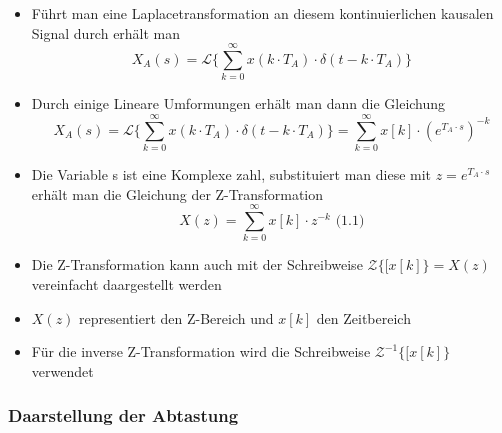 \documentclass[11pt]{article}
\providecommand{\tightlist}{%
      \setlength{\itemsep}{0pt}\setlength{\parskip}{0pt}}
\begin{document}
    \begin{itemize}
\tightlist
\item
  Führt man eine Laplacetransformation an diesem kontinuierlichen
  kausalen Signal durch erhält man
  \[X_A(s) = \mathcal{L}\{\sum_{k=0}^\infty x( k \cdot T_A ) \cdot \delta ( t - k \cdot T_A )\}\label{eq:xAs}\]
\end{itemize}

    \begin{itemize}
\tightlist
\item
  Durch einige Lineare Umformungen erhält man dann die Gleichung
  \[X_A(s) = \mathcal{L}\{\sum_{k=0}^\infty x( k \cdot T_A ) \cdot \delta ( t - k \cdot T_A )\} = \sum_{k=0}^\infty x[k] \cdot (e^{T_A \cdot s})^{-k}\label{eq:LxAk}\]
\end{itemize}

    \begin{itemize}
\tightlist
\item
  Die Variable s ist eine Komplexe zahl, substituiert man diese mit
  \(z = e^{T_A \cdot s}\label{eq:Zsubs}\) erhält man die Gleichung der
  Z-Transformation
  \[X(z) = \sum_{k=0}^\infty x[k] \cdot z^{-k}\textrm{  (1.1)}\]
\end{itemize}

    \begin{itemize}
\item
  Die Z-Transformation kann auch mit der Schreibweise
  \(\mathcal{Z}\{[x[k]\} = X(z)\) vereinfacht daargestellt werden
\item
  \(X(z)\) representiert den Z-Bereich und \(x[k]\) den Zeitbereich
\item
  Für die inverse Z-Transformation wird die Schreibweise
  \({\mathcal{Z}}^{-1}\{[x[k]\}\) verwendet
\end{itemize}

    \subsubsection{Daarstellung der
Abtastung}\label{daarstellung-der-abtastung}
\end{document}
